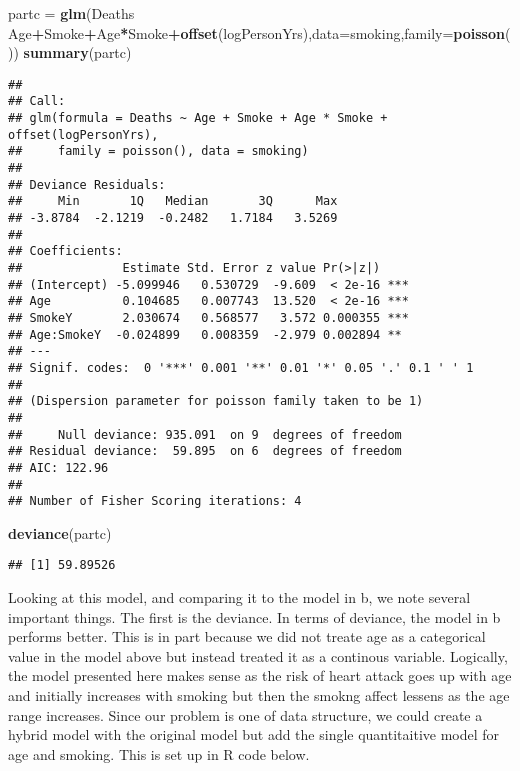 \documentclass[
]{article}
\newenvironment{Shaded}{\begin{snugshade}}{\end{snugshade}}
\newcommand{\DataTypeTok}[1]{\textcolor[rgb]{0.13,0.29,0.53}{#1}}
\newcommand{\KeywordTok}[1]{\textcolor[rgb]{0.13,0.29,0.53}{\textbf{#1}}}
\newcommand{\NormalTok}[1]{#1}
\newcommand{\OperatorTok}[1]{\textcolor[rgb]{0.81,0.36,0.00}{\textbf{#1}}}
\newcommand{\StringTok}[1]{\textcolor[rgb]{0.31,0.60,0.02}{#1}}
\begin{document}
\begin{Shaded}
\begin{Highlighting}[]
\NormalTok{partc =}\StringTok{ }\KeywordTok{glm}\NormalTok{(Deaths }\OperatorTok{~}\StringTok{ }\NormalTok{Age}\OperatorTok{+}\NormalTok{Smoke}\OperatorTok{+}\NormalTok{Age}\OperatorTok{*}\NormalTok{Smoke}\OperatorTok{+}\KeywordTok{offset}\NormalTok{(logPersonYrs),}\DataTypeTok{data=}\NormalTok{smoking,}\DataTypeTok{family=}\KeywordTok{poisson}\NormalTok{())}
\KeywordTok{summary}\NormalTok{(partc)}
\end{Highlighting}
\end{Shaded}

\begin{verbatim}
## 
## Call:
## glm(formula = Deaths ~ Age + Smoke + Age * Smoke + offset(logPersonYrs), 
##     family = poisson(), data = smoking)
## 
## Deviance Residuals: 
##     Min       1Q   Median       3Q      Max  
## -3.8784  -2.1219  -0.2482   1.7184   3.5269  
## 
## Coefficients:
##              Estimate Std. Error z value Pr(>|z|)    
## (Intercept) -5.099946   0.530729  -9.609  < 2e-16 ***
## Age          0.104685   0.007743  13.520  < 2e-16 ***
## SmokeY       2.030674   0.568577   3.572 0.000355 ***
## Age:SmokeY  -0.024899   0.008359  -2.979 0.002894 ** 
## ---
## Signif. codes:  0 '***' 0.001 '**' 0.01 '*' 0.05 '.' 0.1 ' ' 1
## 
## (Dispersion parameter for poisson family taken to be 1)
## 
##     Null deviance: 935.091  on 9  degrees of freedom
## Residual deviance:  59.895  on 6  degrees of freedom
## AIC: 122.96
## 
## Number of Fisher Scoring iterations: 4
\end{verbatim}

\begin{Shaded}
\begin{Highlighting}[]
\KeywordTok{deviance}\NormalTok{(partc)}
\end{Highlighting}
\end{Shaded}

\begin{verbatim}
## [1] 59.89526
\end{verbatim}

Looking at this model, and comparing it to the model in b, we note
several important things. The first is the deviance. In terms of
deviance, the model in b performs better. This is in part because we did
not treate age as a categorical value in the model above but instead
treated it as a continous variable. Logically, the model presented here
makes sense as the risk of heart attack goes up with age and initially
increases with smoking but then the smokng affect lessens as the age
range increases. Since our problem is one of data structure, we could
create a hybrid model with the original model but add the single
quantitaitive model for age and smoking. This is set up in R code below.
\end{document}
